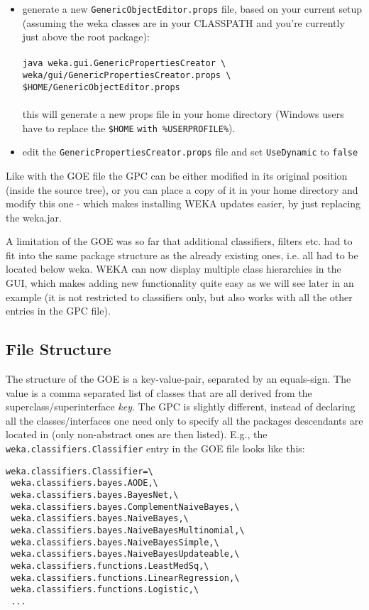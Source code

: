 \begin{itemize}
\item generate a new \verb=GenericObjectEditor.props= file, based on your current setup (assuming the weka classes are in your CLASSPATH and you're currently just above the root package):\\ \\
\verb=java weka.gui.GenericPropertiesCreator \= \\
\verb=weka/gui/GenericPropertiesCreator.props \= \\
\verb=$HOME/GenericObjectEditor.props=\\ \\
this will generate a new props file in your home directory (Windows users have to replace the \verb=$HOME= 
\verb=with %USERPROFILE%=).

\item edit the \verb=GenericPropertiesCreator.props= file and set \verb=UseDynamic= to \verb=false=
\end{itemize}

\noindent Like with the GOE file the GPC can be either modified in its original
position (inside the source tree), or you can place a copy of it in
your home directory and modify this one - which makes installing WEKA
updates easier, by just replacing the weka.jar.

A limitation of the GOE was so far that additional classifiers,
filters etc. had to fit into the same package structure as the already
existing ones, i.e. all had to be located below weka. WEKA can now
display multiple class hierarchies in the GUI, which makes adding new
functionality quite easy as we will see later in an example (it is not
restricted to classifiers only, but also works with all the other
entries in the GPC file).

\subsection{File Structure}
The structure of the GOE is a key-value-pair, separated by an
equals-sign. The value is a comma separated list of classes that are
all derived from the superclass/superinterface \textit{key}. The GPC is
slightly different, instead of declaring all the classes/interfaces
one need only to specify all the packages descendants are located in
(only non-abstract ones are then listed). E.g., the
\verb=weka.classifiers.Classifier= entry in the GOE file looks like this:

\begin{verbatim}
weka.classifiers.Classifier=\
 weka.classifiers.bayes.AODE,\
 weka.classifiers.bayes.BayesNet,\
 weka.classifiers.bayes.ComplementNaiveBayes,\
 weka.classifiers.bayes.NaiveBayes,\
 weka.classifiers.bayes.NaiveBayesMultinomial,\
 weka.classifiers.bayes.NaiveBayesSimple,\
 weka.classifiers.bayes.NaiveBayesUpdateable,\
 weka.classifiers.functions.LeastMedSq,\
 weka.classifiers.functions.LinearRegression,\
 weka.classifiers.functions.Logistic,\
 ...
\end{verbatim}

